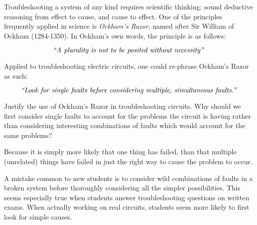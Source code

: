 

Troubleshooting a system of any kind requires scientific thinking: sound deductive reasoning from effect to cause, and cause to effect.  One of the principles frequently applied in science is {\it Ockham's Razor}, named after Sir William of Ockham (1284-1350).  In Ockham's own words, the principle is as follows:

\vskip 10pt

$$\hbox{\it ``A plurality is not to be posited without necessity''}$$

\vskip 10pt

Applied to troubleshooting electric circuits, one could re-phrase Ockham's Razor as such:

$$\hbox{\it ``Look for single faults before considering multiple, simultaneous faults.''}$$

\vskip 10pt

Justify the use of Ockham's Razor in troubleshooting circuits.  Why should we first consider single faults to account for the problems the circuit is having rather than considering interesting combinations of faults which would account for the same problems?







Because it is simply more likely that one thing has failed, than that multiple (unrelated) things have failed in just the right way to cause the problem to occur.







A mistake common to new students is to consider wild combinations of faults in a broken system before thoroughly considering all the simpler possibilities.  This seems especially true when students answer troubleshooting questions on written exams.  When actually working on real circuits, students seem more likely to first look for simple causes.




